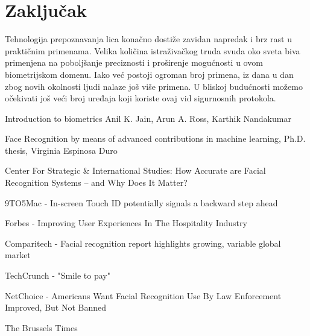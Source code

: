 \documentclass[11pt, a4paper]{article}
\begin{document}
\begin{enumerate}
    
\end{enumerate}

\section{Zaključak}
Tehnologija prepoznavanja lica konačno dostiže zavidan napredak i brz rast u praktičnim primenama. Velika količina istraživačkog truda svuda oko sveta biva primenjena na poboljšanje preciznosti i proširenje mogućnosti u ovom biometrijskom domenu. Iako već postoji ogroman broj primena, iz dana u dan zbog novih okolnosti ljudi nalaze još više primena. U bliskoj budućnosti možemo očekivati još veći broj uređaja koji koriste ovaj vid sigurnosnih protokola. 





\newpage
\begin{thebibliography}{9}

    Introduction to biometrics Anil K. Jain, Arun A. Ross, Karthik Nandakumar

    Face Recognition by means of advanced contributions in machine learning, Ph.D. thesis, Virginia Espinosa Duro
    
    Center For Strategic \& International Studies: How Accurate are Facial Recognition Systems – and Why Does It Matter?

    9TO5Mac - In-screen Touch ID potentially signals a backward step ahead

    Forbes - Improving User Experiences In The Hospitality Industry

    Comparitech - Facial recognition report highlights growing, variable global market

    TechCrunch - "Smile to pay"

    NetChoice - Americans Want Facial Recognition Use By Law Enforcement Improved, But Not Banned

    The Brussels Times

    
    
    
    
\end{thebibliography}
\end{document}
